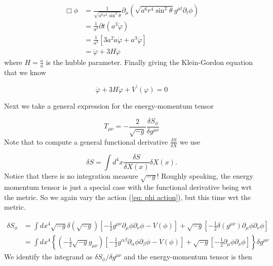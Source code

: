 \begin{align*}
    \Box \phi &= \frac{1}{\sqrt{a^6 r^4 \sin^2 \theta}} \partial_{\mu} (\sqrt{a^6 r^4 \sin^2 \theta} g^{\mu t} \partial_{t} \phi) \\
    &= \frac{1}{a^3} \partial{t} (a^3 \dot{\varphi}) \\
    &= \frac{1}{a^3} [3a^2 \dot{a} \dot{\varphi} + a^3 \ddot{\varphi}] \\
    &= \ddot{\varphi} + 3H \dot{\varphi}
\end{align*}
where $H = \frac{\dot{a}}{a}$ is the hubble parameter. Finally giving the Klein-Gordon equation that we know

\begin{equation*}
    \boxed{\ddot{\varphi} + 3H \dot{\varphi} + V^{\prime} (\varphi) = 0}
\end{equation*}

Next we take a general expression for the energy-momentum tensor

\begin{equation*}
    T_{\mu \nu} = -\frac{2}{\sqrt{-g}} \frac{\delta S_{\phi}}{\delta g^{\mu \nu}}
\end{equation*}
Note that to compute a general functional derivative $\frac{\delta S}{\delta X}$ we use

\begin{equation*}
    \delta S = \int d^4 x \frac{\delta S}{\delta X(x)} \delta X(x). 
\end{equation*}
Notice that there is no integration measure $\sqrt{-g}$! Roughly speaking, the energy momentum tensor is just a special case with the functional derivative being wrt the metric. So we again vary the action (\ref{eq: phi action}), but this time wrt the metric.

\begin{align*}
    \delta S_{\phi} &= \int dx^4 \sqrt{-g} \delta(\sqrt{-g}) \left[ -\frac{1}{2} g^{\mu \nu} \partial_{\mu} \phi \partial_{\nu} \phi - V(\phi) \right] + \sqrt{-g} \left[ -\frac{1}{2} \delta(g^{\mu \nu}) \partial_{\mu} \phi \partial_{\nu} \phi\right] \\
    &= \int dx^4 \left\{ \left( -\frac{1}{2} \sqrt{-g} g_{\mu \nu} \right) \left[ -\frac{1}{2} g^{\alpha \beta} \partial_{\alpha} \phi \partial_{\beta} \phi - V(\phi) \right] + \sqrt{-g} \left[ -\frac{1}{2} \partial_{\mu} \phi \partial_{\nu} \phi\right] \right\} \delta g^{\mu \nu}
\end{align*}
We identify the integrand as $\delta S_{\phi} / \delta g^{\mu \nu}$ and the energy-momentum tensor is then

